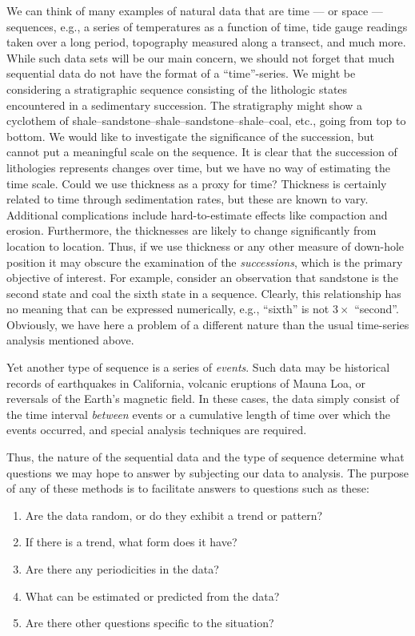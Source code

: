       We can think of many examples of natural data that are time --- or space ---
sequences, e.g., a series of temperatures as a function of time, tide gauge readings taken over  a 
long period, topography measured along a transect, and much more.  While such data sets will be our 
main concern, we should not forget that much sequential data do not have the format 
of a ``time''-series.  We might be considering a stratigraphic sequence consisting of the lithologic 
states encountered in a sedimentary succession.  The stratigraphy might show a cyclothem of 
shale--sandstone--shale--sandstone--shale--coal, etc., going from top to bottom.  We would like to 
investigate the significance of the succession, but cannot put a meaningful scale on the sequence.  
It is clear that the succession of lithologies represents changes over time, but we have no way of 
estimating the time scale.  Could we use thickness as a proxy for time?  Thickness is certainly related 
to time through sedimentation rates, but these are known to vary.  Additional complications include 
hard-to-estimate effects like compaction and erosion.  Furthermore, the thicknesses are likely to change 
significantly from location to location.  Thus, if we use thickness or any other measure of down-hole
position it may obscure the examination of the \emph{successions}, which is the primary objective of interest. 
For example, consider an observation that sandstone is the second state and coal the sixth state
in a sequence.  Clearly, this relationship has no meaning that can be 
expressed numerically, e.g., ``sixth'' is not $3 \times$ ``second''.  Obviously, we have here a problem of a 
different nature than the usual time-series analysis mentioned above.  

	Yet another type of sequence is a series of \emph{events}.  Such data may be historical records of 
earthquakes in California, volcanic eruptions of Mauna Loa, or reversals of the Earth's magnetic field.
In these cases, the data simply consist of the time interval \emph{between} events or a cumulative length of time over
which the events occurred, and special analysis techniques are required.

Thus, the nature of the sequential data and the type of sequence determine what questions we 
may hope to answer by subjecting our data to analysis.  The purpose of any of these methods is to 
facilitate answers to questions such as these:
\begin{enumerate}
\item	Are the data random, or do they exhibit a trend or pattern?
	\item	If there is a trend, what form does it have?
	\item	Are there any periodicities in the data?
	\item	What can be estimated or predicted from the data?
	\item	Are there other questions specific to the situation?
\end{enumerate}

